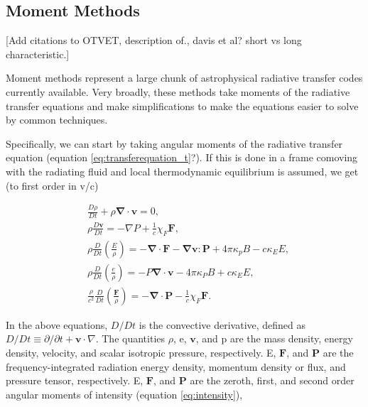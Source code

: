 
\subsection{Moment Methods}
\label{sec:momentmethods}

[Add citations to OTVET, description of., davis et al? short vs long characteristic.]

Moment methods represent a large chunk of astrophysical radiative transfer codes currently available. Very broadly, these methods take moments of the radiative transfer equations and make simplifications to make the equations easier to solve by common techniques.

Specifically, we can start by taking angular moments of the radiative transfer equation (equation \ref{eq:transferequation_t}?). If this is done in a frame comoving with the radiating fluid and local thermodynamic equilibrium is assumed, we get (to first order in v/c) \citep{mihalasMihalas84}

\begin{align}
&\frac{D\rho}{Dt} + \rho \mathbf{\nabla \cdot v} = 0,\label{eq:rhd1}\\
&\rho \frac{D\mathbf{v}}{Dt} = -\nabla P + \frac{1}{c}\chi_F \mathbf{F},\label{eq:rhd2}\\
&\rho \frac{D}{Dt}\left(\frac{E}{\rho}\right) = -\mathbf{\nabla \cdot F} - \mathbf{\nabla v:P} + 4\pi\kappa_p B - c\kappa_E E,\label{eq:rhd3}\\
&\rho \frac{D}{Dt}\left(\frac{e}{\rho}\right) = -P\mathbf{\nabla \cdot v} - 4\pi \kappa_P B + c\kappa_E E,\label{eq:rhd4}\\
&\frac{\rho}{c^2}\frac{D}{Dt}\left(\frac{\mathbf{F}}{\rho}\right) = -\mathbf{\nabla \cdot P} - \frac{1}{c} \chi_F \mathbf{F}.\label{eq:rhd5}
\end{align}

In the above equations, $D/Dt$ is the convective derivative, defined as $D/Dt \equiv \partial / \partial t + \mathbf{v}\cdot \nabla$. The quantities $\rho$, e, $\mathbf{v}$, and p are the mass density, energy density, velocity, and scalar isotropic pressure, respectively. E, $\mathbf{F}$, and $\mathbf{P}$ are the frequency-integrated radiation energy density, momentum density or flux, and pressure tensor, respectively. E, $\mathbf{F}$, and $\mathbf{P}$ are the zeroth, first, and second order angular moments of intensity (equation \ref{eq:intensity}),

